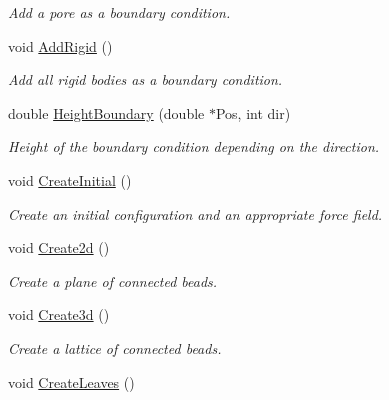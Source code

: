 \begin{DoxyCompactItemize}
\begin{DoxyCompactList}\small\item\em Add a pore as a boundary condition. \end{DoxyCompactList}\item 
void \hyperlink{classForces_adee9a7de583494983844ed4378f51df4}{Add\+Rigid} ()\hypertarget{classForces_adee9a7de583494983844ed4378f51df4}{}\label{classForces_adee9a7de583494983844ed4378f51df4}

\begin{DoxyCompactList}\small\item\em Add all rigid bodies as a boundary condition. \end{DoxyCompactList}\item 
double \hyperlink{classForces_a68881ea0f9f8038dc0e6a714df062896}{Height\+Boundary} (double $\ast$Pos, int dir)
\begin{DoxyCompactList}\small\item\em Height of the boundary condition depending on the direction. \end{DoxyCompactList}\item 
void \hyperlink{classForces_ab18de8ad228c4133d61e09f94ef4b33f}{Create\+Initial} ()\hypertarget{classForces_ab18de8ad228c4133d61e09f94ef4b33f}{}\label{classForces_ab18de8ad228c4133d61e09f94ef4b33f}

\begin{DoxyCompactList}\small\item\em Create an initial configuration and an appropriate force field. \end{DoxyCompactList}\item 
void \hyperlink{classForces_a9e66d18b6b637a388161c4310deb71e9}{Create2d} ()\hypertarget{classForces_a9e66d18b6b637a388161c4310deb71e9}{}\label{classForces_a9e66d18b6b637a388161c4310deb71e9}

\begin{DoxyCompactList}\small\item\em Create a plane of connected beads. \end{DoxyCompactList}\item 
void \hyperlink{classForces_a71fdb49e2a01e439097a4cde373b639f}{Create3d} ()\hypertarget{classForces_a71fdb49e2a01e439097a4cde373b639f}{}\label{classForces_a71fdb49e2a01e439097a4cde373b639f}

\begin{DoxyCompactList}\small\item\em Create a lattice of connected beads. \end{DoxyCompactList}\item 
void \hyperlink{classForces_ada62abd7228e54fbd365aba5aaf4ce8f}{Create\+Leaves} ()\hypertarget{classForces_ada62abd7228e54fbd365aba5aaf4ce8f}{}\label{classForces_ada62abd7228e54fbd365aba5aaf4ce8f}


\end{DoxyCompactItemize}

